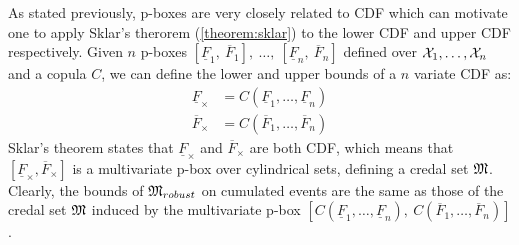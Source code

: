 As stated previously, p-boxes are very closely related to CDF which can motivate one to apply Sklar's therorem (\ref{theorem:sklar}) to the lower CDF and upper CDF respectively. Given $n$ p-boxes $[\underline{F}_1,~\overline{F}_1],~\dots,~[\underline{F}_n,~\overline{F}_n]$ defined over ${\mathcal{X}}_1,\dots,{\mathcal{X}}_n$ and a copula $C$, we can define the lower and upper bounds of a $n$ variate CDF as:
\begin{align*}
    \underline{F}_\times&=C(\underline{F}_1,\dots, \underline{F}_n)\\
    \overline{F}_\times&=C(\overline{F}_1,\dots, \overline{F}_n)
\end{align*}
Sklar's theorem states that $\underline{F}_\times$ and $\overline{F}_\times$ are both CDF, which means that $[\underline{F}_\times, \overline{F}_\times]$ is a multivariate p-box \cite{pelessoni_bivariate_2016, montes_sklars_2015} over cylindrical sets, defining a credal set ${\mathfrak{M}}$. Clearly, the bounds of ${\mathfrak{M}}_{robust}$ on cumulated events are the same as those of the credal set ${\mathfrak{M}}$ induced by the multivariate p-box $[C(\underline{F}_1,\dots, \underline{F}_n),~C(\overline{F}_1,\dots, \overline{F}_n)]$.


